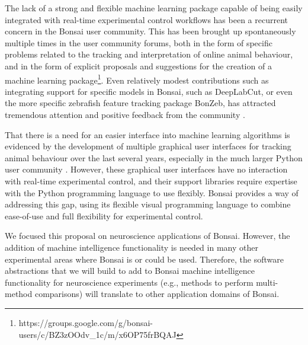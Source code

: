 The lack of a strong and
flexible machine learning package capable of being easily integrated with
real-time experimental control workflows has been a recurrent concern in the
Bonsai user community. This has been brought up spontaneously multiple times in
the user community forums, both in the form of specific problems related to the
tracking and interpretation of online animal behaviour, and in the form of
explicit proposals and suggestions for the creation of a machine learning
package\footnote{https://groups.google.com/g/bonsai-users/c/BZ3zOOdv\_1c/m/x6OP75frBQAJ}. Even
relatively modest contributions such as integrating support for specific models
in Bonsai, such as DeepLabCut, or even the more specific zebrafish feature
tracking package BonZeb, has attracted tremendous attention and positive
feedback from the community \citep[e.g.,][]{kaneEtAl20,guilbeaultEtAl21}.

That there is a need for an easier interface into machine learning algorithms
is evidenced by the development of multiple graphical user interfaces for
tracking animal behaviour over the last several years, especially in the much
larger Python user community
\citep[e.g.,][]{walterAndCouzin21,guilbeaultEtAl21}. However, these graphical
user interfaces have no interaction with real-time experimental control, and
their support libraries require expertise with the Python programming language
to use flexibly. Bonsai provides a way of addressing this gap, using its
flexible visual programming language to combine ease-of-use and full
flexibility for experimental control.

We focused this proposal on neuroscience applications of Bonsai. However, the
addition of machine intelligence functionality is needed in many other
experimental areas where Bonsai is or could be used. Therefore, the software
abstractions that we will build to add to Bonsai machine intelligence
functionality for neuroscience experiments (e.g., methods to perform
multi-method comparisons) will translate to other application domains of
Bonsai.

